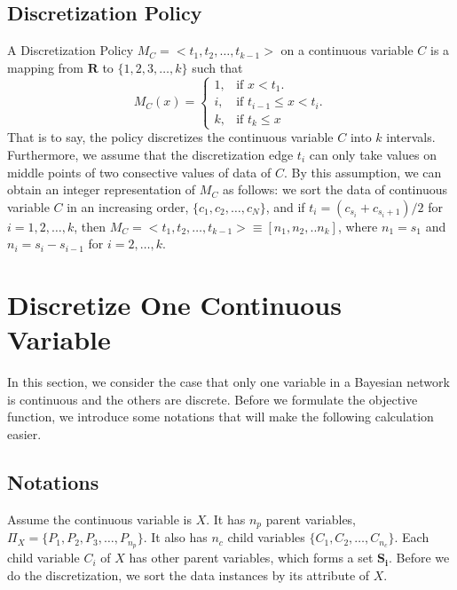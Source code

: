 {\subsection{Discretization Policy}
\label{Disc_p}
A Discretization Policy $M_C = < t_1,t_2, \ldots, t_{k-1} >$ on a continuous variable $C$ is a mapping from $\boldsymbol{R}$ to $\{1,2,3,\ldots,k \}$ such that
\begin{equation}
  M_C (x)=\begin{cases}
    1, & \text{if $x<t_1$}.\\
    i, & \text{if $t_{i-1} \leq x < t_i$}.\\
    k, & \text{if $t_k \leq x$}
  \end{cases}
\end{equation}
That is to say, the policy discretizes the continuous variable $C$ into $k$ intervals. Furthermore, we assume that the discretization edge $t_i$ can only take values on middle points of two consective values of data of $C$. By this assumption, we can obtain an integer representation of $M_C$ as follows:
we sort the data of continuous variable $C$ in an increasing order, $\{ c_1,c_2,\ldots,c_N \}$, and if $t_i = (c_{s_{i}} + c_{s_{i}+1})/2$ for $i=1,2,\ldots,k$, then $M_C = < t_1,t_2, \ldots, t_{k-1} > \equiv [n_1,n_2,..n_k]$, where $n_1 = s_1$ and $n_i = s_{i} - s_{i-1}$ for $i = 2,\ldots,k$.\\

\section{Discretize One Continuous Variable}
\label{one-conti}
In this section, we consider the case that only one variable in a Bayesian network is continuous and the others are discrete. Before we formulate the objective function, we introduce some notations that will make the following calculation easier.
\subsection{Notations}
\label{Notation}
Assume the continuous variable is $X$. It has $n_p$ parent variables, $\Pi_X = \{ P_1, P_2, P_3,\ldots,P_{n_p}\}$. It also has $n_c$ child variables $\{ C_1, C_2,\ldots,C_{n_c}\}$. Each child variable $C_i$ of $X$ has other parent variables, which forms a set $\boldsymbol{S_i}$. Before we do the discretization, we sort the data instances by its attribute of $X$.

}
